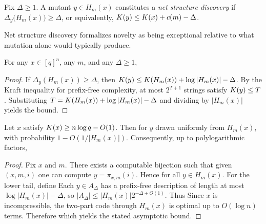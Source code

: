 \begin{definition}\label{def:si:discovery}
Fix $\Delta\ge 1$. A mutant $y\in H_m(x)$ constitutes a \emph{net structure discovery} if
$\Delta_y\big(H_m(x)\big)\ge\Delta$, or equivalently, $K(y)\le K(x)+c(m)-\Delta$.
\end{definition}
Net structure discovery formalizes novelty as being exceptional relative to what mutation alone would typically produce.

\begin{theorem}\label{thm:si:upper}
For any $x\in[q]^n$, any $m$, and any $\Delta\ge 1$,
\end{theorem}

\begin{proof}
If $\Delta_y(H_m(x))\ge\Delta$, then
$K(y)\le K(H_m(x))+\log|H_m(x)|-\Delta$.
By the Kraft inequality for prefix-free complexity, at most $2^{T+1}$ strings satisfy $K(y)\le T$. Substituting
$T=K(H_m(x))+\log|H_m(x)|-\Delta$ and dividing by $|H_m(x)|$ yields the bound.
\end{proof}

\begin{lemma}\label{lem:si:tight}
Let $x$ satisfy $K(x)\ge n\log q-O(1)$. Then for $y$ drawn uniformly from $H_m(x)$,
with probability $1-O(1/|H_m(x)|)$. Consequently, up to polylogarithmic factors,
\end{lemma}

\begin{proof}
Fix $x$ and $m$. There exists a computable bijection
such that given $(x,m,i)$ one can compute $y=\pi_{x,m}(i)$. Hence
for all $y\in H_m(x)$. For the lower tail, define
Each $y\in A_\Delta$ has a prefix-free description of length at most
$\log|H_m(x)|-\Delta$, so $|A_\Delta|\le |H_m(x)|2^{-\Delta+O(1)}$. Thus
Since $x$ is incompressible, the two-part code through $H_m(x)$ is optimal up to $O(\log n)$ terms. Therefore
which yields the stated asymptotic bound.
\end{proof}


